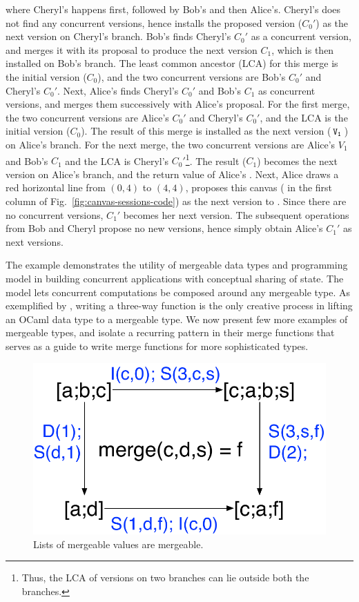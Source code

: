 where Cheryl's  happens first, followed by Bob's and then
Alice's.  Cheryl's  does not find any concurrent versions,
hence installs the proposed version ($C_0'$) as the next version on
Cheryl's branch. Bob's  finds Cheryl's $C_0'$ as a concurrent
version, and merges it with its proposal to produce the next version
$C_1$, which is then installed on Bob's branch.  The least common
ancestor (LCA) for this merge is the initial version ($C_0$), and the
two concurrent versions are Bob's $C_0'$ and Cheryl's $C_0'$. Next,
Alice's  finds Cheryl's $C_0'$ and Bob's $C_1$ as concurrent
versions, and merges them successively with Alice's proposal. For the
first merge, the two concurrent versions are Alice's $C_0'$ and
Cheryl's $C_0'$, and the LCA is the initial version ($C_0$). The
result of this merge is installed as the next version ($\,{\tt V_1}\,$) on
Alice's branch. For the next merge, the two concurrent versions are
Alice's $V_1$ and Bob's $C_1$ and the LCA is Cheryl's
$C_0'$\footnote{Thus, the LCA of versions on two branches can lie
  outside both the branches.}. The result ($C_1$) becomes the next
version on Alice's branch, and the return value of Alice's .
Next, Alice draws a red horizontal line from $(0,4)$ to $(4,4)$,
proposes this canvas ( in the first column of
Fig.~\ref{fig:canvas-sessions-code}) as the next version to .
Since there are no concurrent versions, $C_1'$ becomes her next
version. The subsequent  operations from Bob and Cheryl
propose no new versions, hence simply obtain Alice's $C_1'$ as next
versions.

The \drawsome example demonstrates the utility of mergeable data types
and \name programming model in building concurrent applications with
conceptual sharing of state. The model lets concurrent computations be
composed around any mergeable type. As exemplified by \drawsome,
writing a three-way  function is the only creative process in
lifting an OCaml data type to a mergeable type. We now present few
more examples of mergeable types, and isolate a recurring pattern in
their merge functions that serves as a guide to write merge functions
for more sophisticated types.

\begin{figure}
  \centering
  \includegraphics[scale=0.4]{Figures/list-eg}

  \caption{Lists of mergeable values are mergeable. }
  \label{fig:list-eg}
\end{figure}


